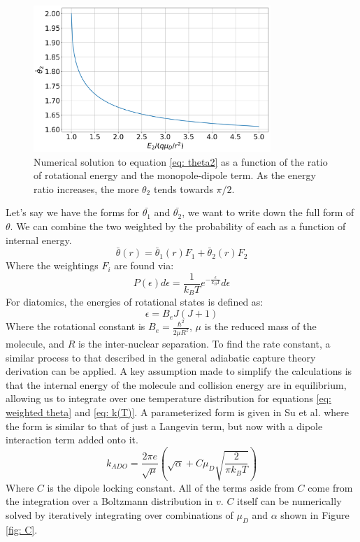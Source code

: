 \begin{enumerate}
	\begin{figure}[H]
		\label{fig: theta2}
		\centering
		\includegraphics[width=0.8\textwidth]{images/ADO_theta2.png}
		\caption{Numerical solution to equation \ref{eq: theta2} as a function of the ratio of rotational energy and the monopole-dipole term. As the energy ratio increases, the more $\theta_2$ tends towards $\pi/2$.}
	\end{figure}

\end{enumerate}

Let's say we have the forms for $\bar{\theta_1}$ and $\bar{\theta_2}$, we want to write down the full form of $\theta$. We can combine the two weighted by the probability of each as a function of internal energy.
\begin{equation}
    \bar{\theta}(r) = \bar{\theta}_1(r) F_1 + \bar{\theta}_2(r) F_2 \label{eq: weighted theta}
\end{equation}
Where the weightings $F_i$ are found via:
\begin{equation*}
    P(\epsilon) d\epsilon = \frac{1}{k_BT}e^{-\frac{\epsilon}{k_BT}}d\epsilon
\end{equation*}
For diatomics, the energies of rotational states is defined as:
\begin{equation*}
    \epsilon = B_e J(J+1)
\end{equation*}
Where the rotational constant is $B_e=\frac{\hbar^2}{2\mu R^2}$, $\mu$ is the reduced mass of the molecule, and $R$ is the inter-nuclear separation. To find the rate constant, a similar process to that described in the general adiabatic capture theory derivation can be applied. A key assumption made to simplify the calculations is that the internal energy of the molecule and collision energy are in equilibrium, allowing us to integrate over one temperature distribution for equations \ref{eq: weighted theta} and \ref{eq: k(T)}. A parameterized form is given in Su et al. where the form is similar to that of just a Langevin term, but now with a dipole interaction term added onto it.\cite{Su1973}
\begin{equation}
    k_{ADO} = \frac{2 \pi e}{\sqrt{\mu}}\left(\sqrt{\alpha}+C \mu_D\sqrt{\frac{2}{\pi k_B T}}\right)
    \label{eq: k ADO}
\end{equation}
Where $C$ is the dipole locking constant. All of the terms aside from $C$ come from the integration over a Boltzmann distribution in $v$. $C$ itself can be numerically solved by iteratively integrating over combinations of $\mu_D$ and $\alpha$ shown in Figure \ref{fig: C}.\cite{Su1973}\cite{Troe1985}


